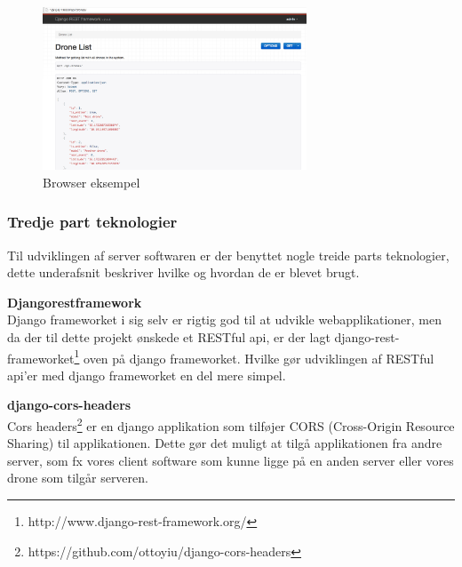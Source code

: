 \begin{figure}[H]
	\centering
	\includegraphics[width=0.7\textwidth]{Billeder/implementation/browser_eksempel.png}
	\caption{Browser eksempel}
	\label{fig:browser_eksempel}
\end{figure}

\newpage

\subsubsection*{Tredje part teknologier}
Til udviklingen af server softwaren er der benyttet nogle treide parts teknologier, dette underafsnit beskriver hvilke og hvordan de er blevet brugt.

\textbf{Djangorestframework}\\
Django frameworket i sig selv er rigtig god til at udvikle webapplikationer, men da der til dette projekt ønskede et RESTful api, er der lagt django-rest-frameworket\footnote{http://www.django-rest-framework.org/} oven på django frameworket. Hvilke gør udviklingen af RESTful api'er med django frameworket en del mere simpel.  

\textbf{django-cors-headers}\\
Cors headers\footnote{https://github.com/ottoyiu/django-cors-headers} er en django applikation som tilføjer CORS (Cross-Origin Resource Sharing) til applikationen. Dette gør det muligt at tilgå applikationen fra andre server, som fx vores client software som kunne ligge på en anden server eller vores drone som tilgår serveren. 